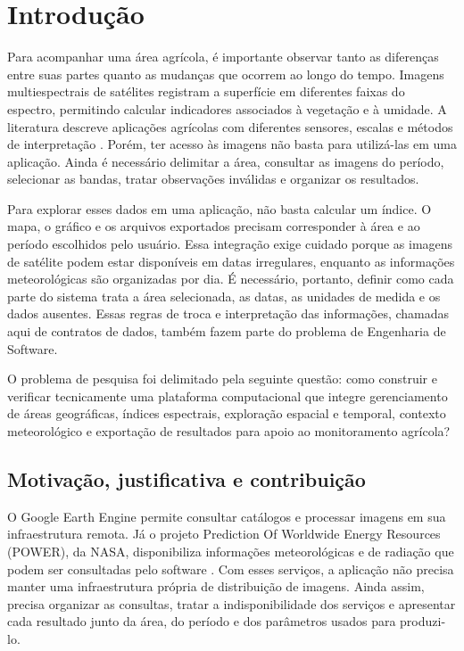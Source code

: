 \section{Introdução}\label{chap:introducao-final}

Para acompanhar uma área agrícola, é importante observar tanto as diferenças entre suas partes quanto as mudanças que ocorrem ao longo do tempo. Imagens multiespectrais de satélites registram a superfície em diferentes faixas do espectro, permitindo calcular indicadores associados à vegetação e à umidade. A literatura descreve aplicações agrícolas com diferentes sensores, escalas e métodos de interpretação \citep{WEISS2020}. Porém, ter acesso às imagens não basta para utilizá-las em uma aplicação. Ainda é necessário delimitar a área, consultar as imagens do período, selecionar as bandas, tratar observações inválidas e organizar os resultados.

Para explorar esses dados em uma aplicação, não basta calcular um índice. O mapa, o gráfico e os arquivos exportados precisam corresponder à área e ao período escolhidos pelo usuário. Essa integração exige cuidado porque as imagens de satélite podem estar disponíveis em datas irregulares, enquanto as informações meteorológicas são organizadas por dia. É necessário, portanto, definir como cada parte do sistema trata a área selecionada, as datas, as unidades de medida e os dados ausentes. Essas regras de troca e interpretação das informações, chamadas aqui de contratos de dados, também fazem parte do problema de Engenharia de Software.

O problema de pesquisa foi delimitado pela seguinte questão: como construir e verificar tecnicamente uma plataforma computacional que integre gerenciamento de áreas geográficas, índices espectrais, exploração espacial e temporal, contexto meteorológico e exportação de resultados para apoio ao monitoramento agrícola?

\subsection{Motivação, justificativa e contribuição}

O Google Earth Engine permite consultar catálogos e processar imagens em sua infraestrutura remota. Já o projeto Prediction Of Worldwide Energy Resources (POWER), da NASA, disponibiliza informações meteorológicas e de radiação que podem ser consultadas pelo software \citep{GORELICK2017,NASA_POWER_DAILY}. Com esses serviços, a aplicação não precisa manter uma infraestrutura própria de distribuição de imagens. Ainda assim, precisa organizar as consultas, tratar a indisponibilidade dos serviços e apresentar cada resultado junto da área, do período e dos parâmetros usados para produzi-lo.


